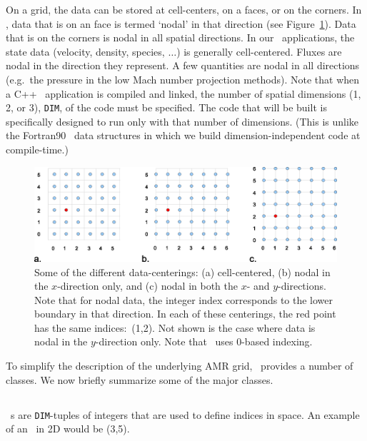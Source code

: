 On a grid, the data can be stored at cell-centers, on a faces, or
on the corners.  In \BoxLib, data that is on an face is termed `nodal'
in that direction (see Figure~\ref{fig:dataloc}).  Data that is on the
corners is nodal in all spatial directions.  In our \BoxLib\ applications, 
the state data (velocity, density, species, $\ldots$) is generally
cell-centered.  Fluxes are nodal in the direction they represent.
A few quantities are nodal in all directions (e.g.\ the pressure in
the low Mach number projection methods).  
Note that when a C++ \BoxLib\ application is compiled and linked,
the number of spatial dimensions (1, 2, or 3), {\tt DIM},
of the code must be specified.  The code that will be
built is specifically designed to run only with that number of dimensions.
(This is unlike the Fortran90 \BoxLib\ data structures in which we build
dimension-independent code at compile-time.)
\begin{figure}[h]
\centering
\includegraphics[width=6.5in]{./Introduction/data_loc2}
\caption{\label{fig:dataloc} Some of the different data-centerings:
(a) cell-centered, (b) nodal in the $x$-direction only, and (c) nodal in
both the $x$- and $y$-directions.  Note that for nodal data, the
integer index corresponds to the lower boundary in that direction.
In each of these centerings, the red point has the same indices:\ (1,2).
Not shown is the case where data is nodal in the $y$-direction only.  
Note that \BoxLib\ uses $0$-based indexing.}
\end{figure}

To simplify the description of the underlying AMR grid, \BoxLib\
provides a number of classes.  We now briefly summarize some of the major
classes.

\subsection{\IntVect}

\IntVect~s are {\tt DIM}-tuples of integers that are used to define
indices in space.  An example of an \IntVect\ in 2D would
be (3,5).

